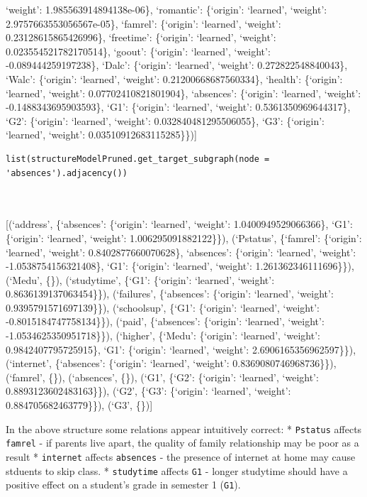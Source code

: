 \documentclass[
]{article}
\begin{document}
`weight': 1.985563914894138e-06\}, `romantic': \{`origin': `learned',
`weight': 2.9757663553056567e-05\}, `famrel': \{`origin': `learned',
`weight': 0.23128615865426996\}, `freetime': \{`origin': `learned',
`weight': 0.023554521782170514\}, `goout': \{`origin': `learned',
`weight': -0.089444259197238\}, `Dalc': \{`origin': `learned', `weight':
0.272822548840043\}, `Walc': \{`origin': `learned', `weight':
0.21200668687560334\}, `health': \{`origin': `learned', `weight':
0.07702410821801904\}, `absences': \{`origin': `learned', `weight':
-0.1488343695903593\}, `G1': \{`origin': `learned', `weight':
0.5361350969644317\}, `G2': \{`origin': `learned', `weight':
0.032840481295506055\}, `G3': \{`origin': `learned', `weight':
0.03510912683115285\}\}){]}

\begin{verbatim}
list(structureModelPruned.get_target_subgraph(node = 'absences').adjacency())



\end{verbatim}

{[}(`address', \{`absences': \{`origin': `learned', `weight':
1.0400949529066366\}, `G1': \{`origin': `learned', `weight':
1.006295091882122\}\}), (`Pstatus', \{`famrel': \{`origin': `learned',
`weight': 0.8402877660070628\}, `absences': \{`origin': `learned',
`weight': -1.0538754156321408\}, `G1': \{`origin': `learned', `weight':
1.261362346111696\}\}), (`Medu', \{\}), (`studytime', \{`G1':
\{`origin': `learned', `weight': 0.8636139137063454\}\}), (`failures',
\{`absences': \{`origin': `learned', `weight': 0.9395791571697139\}\}),
(`schoolsup', \{`G1': \{`origin': `learned', `weight':
-0.8015184747758134\}\}), (`paid', \{`absences': \{`origin': `learned',
`weight': -1.0534625350951718\}\}), (`higher', \{`Medu': \{`origin':
`learned', `weight': 0.9842407795725915\}, `G1': \{`origin': `learned',
`weight': 2.6906165356962597\}\}), (`internet', \{`absences':
\{`origin': `learned', `weight': 0.8369080746968736\}\}), (`famrel',
\{\}), (`absences', \{\}), (`G1', \{`G2': \{`origin': `learned',
`weight': 0.8893123602483163\}\}), (`G2', \{`G3': \{`origin': `learned',
`weight': 0.884705682463779\}\}), (`G3', \{\}){]}

In the above structure some relations appear intuitively correct: *
\texttt{Pstatus} affects \texttt{famrel} -
if parents live apart, the quality of family relationship may be poor as
a result * \texttt{internet} affects
\texttt{absences} - the presence of internet at home may
cause stduents to skip class. * \texttt{studytime} affects
\texttt{G1} - longer studytime should have a positive
effect on a student's grade in semester 1 (\texttt{G1}).
\end{document}
